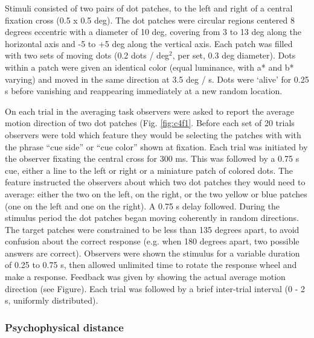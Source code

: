 Stimuli consisted of two pairs of dot patches, to the left and right of a central fixation cross (0.5 x 0.5 deg). The dot patches were circular regions centered 8 degrees eccentric with a diameter of 10 deg, covering from 3 to 13 deg along the horizontal axis and -5 to +5 deg along the vertical axis. Each patch was filled with two sets of moving dots (0.2 dots / deg$^2$, per set, 0.3 deg diameter). Dots within a patch were given an identical color (equal luminance, with a* and b* varying) and moved in the same direction at 3.5 deg / s. Dots were `alive' for 0.25 s before vanishing and reappearing immediately at a new random location.

On each trial in the averaging task observers were asked to report the average motion direction of two dot patches (Fig. \ref{fig:c4f1}. Before each set of 20 trials observers were told which feature they would be selecting the patches with with the phrase ``cue side'' or ``cue color'' shown at fixation. Each trial was initiated by the observer fixating the central cross for 300 ms. This was followed by a 0.75 s cue, either a line to the left or right or a miniature patch of colored dots. The feature instructed the observers about which two dot patches they would need to average: either the two on the left, on the right, or the two yellow or blue patches (one on the left and one on the right). A 0.75 s delay followed. During the stimulus period the dot patches began moving coherently in random directions. The target patches were constrained to be less than 135 degrees apart, to avoid confusion about the correct response (e.g. when 180 degrees apart, two possible answers are correct). Observers were shown the stimulus for a variable duration of 0.25 to 0.75 s, then allowed unlimited time to rotate the response wheel and make a response. Feedback was given by showing the actual average motion direction (see Figure). Each trial was followed by a brief inter-trial interval (0 - 2 s, uniformly distributed).

\subsubsection{Psychophysical distance}

